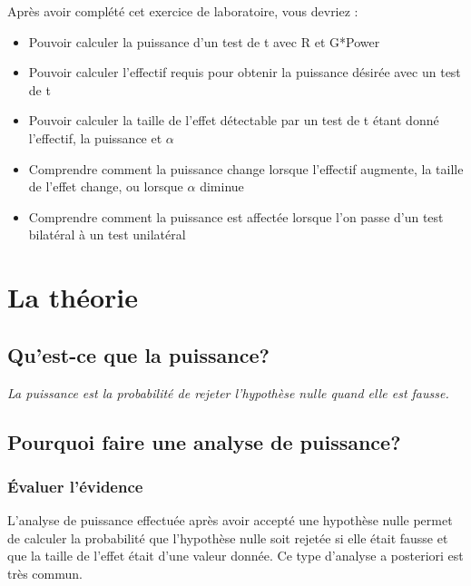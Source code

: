 \documentclass[12pt,]{book}
\providecommand{\tightlist}{%
  \setlength{\itemsep}{0pt}\setlength{\parskip}{0pt}}
\begin{document}
Après avoir complété cet exercice de laboratoire, vous devriez :

\begin{itemize}
\tightlist
\item
  Pouvoir calculer la puissance d'un test de t avec R et G*Power
\item
  Pouvoir calculer l'effectif requis pour obtenir la puissance désirée avec un test de t
\item
  Pouvoir calculer la taille de l'effet détectable par un test de t étant donné l'effectif, la puissance et \(\alpha\)
\item
  Comprendre comment la puissance change lorsque l'effectif augmente, la taille de l'effet change, ou lorsque \(\alpha\) diminue
\item
  Comprendre comment la puissance est affectée lorsque l'on passe d'un test bilatéral à un test unilatéral
\end{itemize}

\hypertarget{la-thuxe9orie}{%
\section{La théorie}\label{la-thuxe9orie}}

\hypertarget{quest-ce-que-la-puissance}{%
\subsection{Qu'est-ce que la puissance?}\label{quest-ce-que-la-puissance}}

\emph{La puissance est la probabilité de rejeter l'hypothèse nulle quand elle est fausse.}

\hypertarget{pourquoi-faire-une-analyse-de-puissance}{%
\subsection{Pourquoi faire une analyse de puissance?}\label{pourquoi-faire-une-analyse-de-puissance}}

\hypertarget{uxe9valuer-luxe9vidence}{%
\subsubsection*{Évaluer l'évidence}\label{uxe9valuer-luxe9vidence}}

L'analyse de puissance effectuée après avoir accepté une hypothèse nulle permet de calculer la probabilité que l'hypothèse nulle soit rejetée si elle était fausse et que la taille de l'effet était d'une valeur donnée.
Ce type d'analyse a posteriori est très commun.
\end{document}
